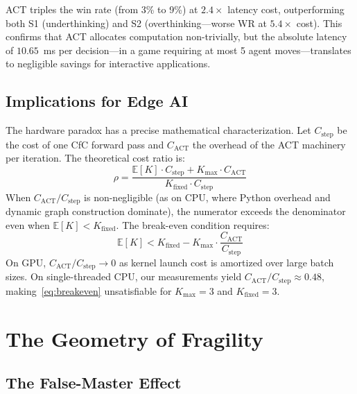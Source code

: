 \documentclass[conference]{IEEEtran}
\newcommand{\E}{\mathbb{E}}
\begin{document}
ACT triples the win rate (from 3\% to 9\%) at $2.4\times$ latency cost, outperforming both S1 (underthinking) and S2 (overthinking---worse WR at $5.4\times$ cost). This confirms that ACT allocates computation non-trivially, but the absolute latency of $10.65$~ms per decision---in a game requiring at most 5 agent moves---translates to negligible savings for interactive applications.

\subsection{Implications for Edge AI}
\label{ssec:hw_implications}

The hardware paradox has a precise mathematical characterization. Let $C_{\text{step}}$ be the cost of one CfC forward pass and $C_{\text{ACT}}$ the overhead of the ACT machinery per iteration. The theoretical cost ratio is:
\begin{equation}
\label{eq:cost_ratio}
\rho = \frac{\E[K] \cdot C_{\text{step}} + K_{\max} \cdot C_{\text{ACT}}}{K_{\text{fixed}} \cdot C_{\text{step}}}
\end{equation}
When $C_{\text{ACT}} / C_{\text{step}}$ is non-negligible (as on CPU, where Python overhead and dynamic graph construction dominate), the numerator exceeds the denominator even when $\E[K] < K_{\text{fixed}}$. The break-even condition requires:
\begin{equation}
\label{eq:breakeven}
\E[K] < K_{\text{fixed}} - K_{\max} \cdot \frac{C_{\text{ACT}}}{C_{\text{step}}}
\end{equation}
On GPU, $C_{\text{ACT}} / C_{\text{step}} \to 0$ as kernel launch cost is amortized over large batch sizes. On single-threaded CPU, our measurements yield $C_{\text{ACT}} / C_{\text{step}} \approx 0.48$, making~\cref{eq:breakeven} unsatisfiable for $K_{\max} = 3$ and $K_{\text{fixed}} = 3$.


\section{The Geometry of Fragility}
\label{sec:fragility}

\subsection{The False-Master Effect}
\label{ssec:false_master}
\end{document}
